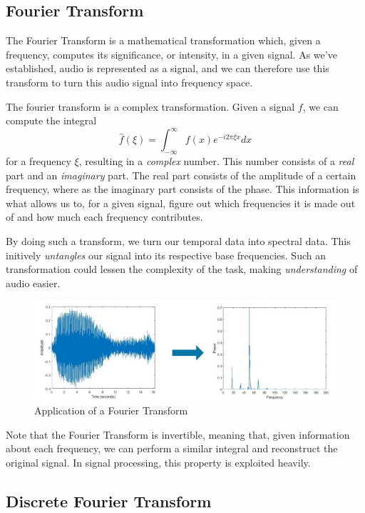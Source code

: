 \subsection{Fourier Transform}

The Fourier Transform is a mathematical transformation which, given a frequency, computes its significance, or intensity, in a given signal. As we've established, audio is represented as a signal, and we can therefore use this transform to turn this audio signal into frequency space. 

The fourier transform is a complex transformation. Given a signal $f$, we can compute the integral $$ \widehat{f}(\xi) = \int^{\infty}_{-\infty}{f(x)e^{-i2\pi \xi x} dx} $$ for a frequency $\xi$, resulting in a \textit{complex} number. This number consists of a \textit{real} part and an \textit{imaginary} part. The real part consists of the amplitude of a certain frequency, where as the imaginary part consists of the phase. This information is what allows us to, for a given signal, figure out which frequencies it is made out of and how much each frequency contributes.

By doing such a transform, we turn our temporal data into spectral data. This initively \textit{untangles} our signal into its respective base frequencies. Such an transformation could lessen the complexity of the task, making \textit{understanding} of audio easier.

\begin{figure}[H]
    \centering
    \includegraphics[scale=0.4]{figures/fft.jpg}
    \caption{Application of a Fourier Transform}
    \label{FTFigure}
\end{figure}

Note that the Fourier Transform is invertible, meaning that, given information about each frequency, we can perform a similar integral and reconstruct the original signal. In signal processing, this property is exploited heavily.

\subsection{Discrete Fourier Transform}

